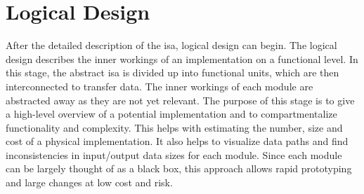 \section{Logical Design} \label{sec:implementation_logical}

After the detailed description of the \ac{isa}, logical design can begin. The logical design describes the inner workings of an implementation on a functional level. In this stage, the abstract \ac{isa} is divided up into functional units, which are then interconnected to transfer data. The inner workings of each module are abstracted away as they are not yet relevant. The purpose of this stage is to give a high-level overview of a potential implementation and to compartmentalize functionality and complexity. This helps with estimating the number, size and cost of a physical implementation. It also helps to visualize data paths and find inconsistencies in input/output data sizes for each module. Since each module can be largely thought of as a black box, this approach allows rapid prototyping and large changes at low cost and risk. 


